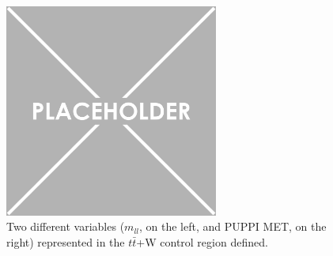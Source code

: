 \documentclass[a4paper, 10pt, openright]{report}
\begin{document}
\begin{figure}[htbp]
{\begin{minipage}[b]{.48\textwidth}
\end{minipage}\hfill
\begin{minipage}[b]{.48\textwidth}
\includegraphics[width=7cm, height=7cm]{figs/placeholder.png}
\end{minipage} \hfill
}
\caption{Two different variables ($m_{ll}$, on the left, and \ac{PUPPI} \ac{MET}, on the right) represented in the $t \bar t$+W control region defined.}
\label{fig:ttWCR}
\end{figure}
\end{document}
